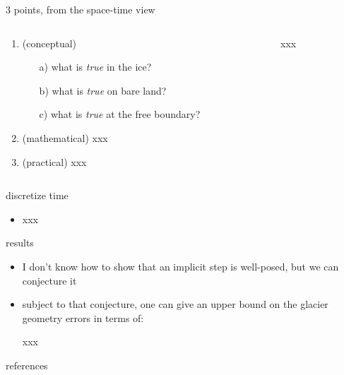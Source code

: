 \documentclass[10pt,dvipsnames]{beamer}
\begin{document}
\begin{frame}{3 points, from the space-time view}

\begin{columns}
\begin{column}{0.7\textwidth}
\begin{enumerate}
\item \alert{(conceptual)}
    \begin{itemize}
    \item[a)] what is \emph{true} in the ice?
    \item[b)] what is \emph{true} on bare land?
    \item[c)] what is \emph{true} at the free boundary?
    \end{itemize}
\item \alert{(mathematical)} xxx
\item \alert{(practical)} xxx
\end{enumerate}
\end{column}
\begin{column}{0.3\textwidth}
xxx %
\end{column}
\end{columns}

\end{frame}


\begin{frame}{discretize time}

\begin{itemize}
\item xxx
\end{itemize}
\end{frame}


\begin{frame}{results}

\begin{itemize}
\item I don't know how to show that an implicit step is well-posed, but we can conjecture it
\item subject to that conjecture, one can give an upper bound on the glacier geometry errors in terms of:

xxx
\end{itemize}
\end{frame}

\begin{frame}{references}

{\footnotesize }
\end{frame}
\end{document}
